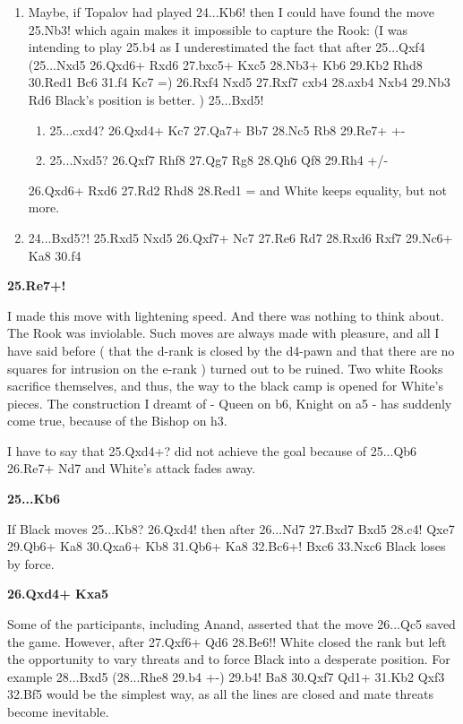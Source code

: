 \documentclass[
	11pt,twocolumn]{article}
\renewcommand{\bf}{\bfseries}
\begin{document}
\begin{enumerate}
\item
Maybe, if Topalov had played 24...Kb6!  then I could have found the move 25.Nb3!  which again makes it impossible to capture the Rook: (I was intending to play 25.b4  as I underestimated the fact that after 25...Qxf4 (25...Nxd5 26.Qxd6+ Rxd6 27.bxc5+ Kxc5 28.Nb3+ Kb6 29.Kb2 Rhd8 30.Red1 Bc6 31.f4 Kc7 =) 26.Rxf4 Nxd5 27.Rxf7 cxb4 28.axb4 Nxb4 29.Nb3 Rd6 Black's position is better. ) 25...Bxd5! 

\begin{enumerate}
\item
25...cxd4? 26.Qxd4+ Kc7 27.Qa7+ Bb7 28.Nc5 Rb8 29.Re7+ +-

\item
25...Nxd5? 26.Qxf7 Rhf8 27.Qg7 Rg8 28.Qh6 Qf8 29.Rh4 +/-
\end{enumerate}

26.Qxd6+ Rxd6 27.Rd2 Rhd8 28.Red1 = and White keeps equality, but not more. 

\item
24...Bxd5?! 25.Rxd5 Nxd5 26.Qxf7+ Nc7 27.Re6 Rd7 28.Rxd6 Rxf7 29.Nc6+ Ka8 30.f4
\end{enumerate}

{\bf 25.Re7+! }

I made this move with lightening speed. And there was nothing to think about. The Rook was inviolable. Such moves are always made with pleasure, and all I have said before ( that the d-rank is closed by the d4-pawn and that there are no squares for intrusion on the e-rank ) turned out to be ruined. Two white Rooks sacrifice themselves, and thus, the way to the black camp is opened for White's pieces. The construction I dreamt of - Queen on b6, Knight on a5 - has suddenly come true, because of the Bishop on h3.



I have to say that 25.Qxd4+?  did not achieve the goal because of 25...Qb6 26.Re7+ Nd7 and White's attack fades away. 

{\bf 25...Kb6 }

If Black moves 25...Kb8? 26.Qxd4!  then after 26...Nd7 27.Bxd7 Bxd5 28.c4! Qxe7 29.Qb6+ Ka8 30.Qxa6+ Kb8 31.Qb6+ Ka8 32.Bc6+! Bxc6 33.Nxc6 Black loses by force. 

{\bf 26.Qxd4+ Kxa5 }

Some of the participants, including Anand, asserted that the move 26...Qc5  saved the game. However, after 27.Qxf6+ Qd6 28.Be6!!  White closed the rank but left the opportunity to vary threats and to force Black into a desperate position. For example 28...Bxd5 (28...Rhe8 29.b4 +-) 29.b4! Ba8 30.Qxf7 Qd1+ 31.Kb2 Qxf3 32.Bf5 would be the simplest way, as all the lines are closed and mate threats become inevitable. 
\end{document}

